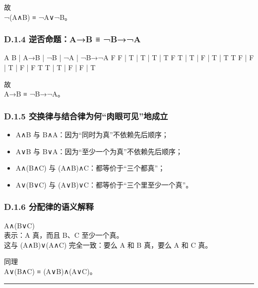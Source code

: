 \documentclass[
  11pt,
]{article}
\newenvironment{Shaded}{}{}
\newcommand{\NormalTok}[1]{#1}
\providecommand{\tightlist}{%
  \setlength{\itemsep}{0pt}\setlength{\parskip}{0pt}}
\begin{document}
故\\
¬(A∧B) ≡ ¬A∨¬B。

\subsubsection{D.1.4 逆否命题：A→B ≡
¬B→¬A}\label{d.1.4-ux9006ux5426ux547dux9898ab-ba}

\begin{Shaded}
\begin{Highlighting}[]
\NormalTok{A  B | A→B | ¬B | ¬A | ¬B→¬A}
\NormalTok{F  F |  T  |  T |  T |   T}
\NormalTok{F  T |  T  |  F |  T |   T}
\NormalTok{T  F |  F  |  T |  F |   F}
\NormalTok{T  T |  T  |  F |  F |   T}
\end{Highlighting}
\end{Shaded}

故\\
A→B ≡ ¬B→¬A。

\subsubsection{D.1.5
交换律与结合律为何``肉眼可见''地成立}\label{d.1.5-ux4ea4ux6362ux5f8bux4e0eux7ed3ux5408ux5f8bux4e3aux4f55ux8089ux773cux53efux89c1ux5730ux6210ux7acb}

\begin{itemize}
\tightlist
\item
  A∧B 与 B∧A：因为``同时为真''不依赖先后顺序；
\item
  A∨B 与 B∨A：因为``至少一个为真''不依赖先后顺序；
\item
  A∧(B∧C) 与 (A∧B)∧C：都等价于``三个都真''；
\item
  A∨(B∨C) 与 (A∨B)∨C：都等价于``三个里至少一个真''。
\end{itemize}

\subsubsection{D.1.6
分配律的语义解释}\label{d.1.6-ux5206ux914dux5f8bux7684ux8bedux4e49ux89e3ux91ca}

A∧(B∨C)\\
表示：A 真，而且 B、C 至少一个真。\\
这与 (A∧B)∨(A∧C) 完全一致：要么 A 和 B 真，要么 A 和 C 真。

同理\\
A∨(B∧C) ≡ (A∨B)∧(A∨C)。

\begin{center}\rule{0.5\linewidth}{0.5pt}\end{center}
\end{document}
